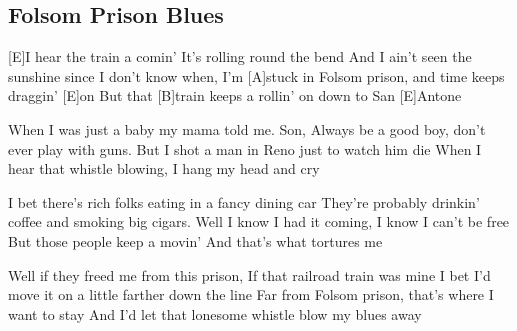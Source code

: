 \subsection*{Folsom Prison Blues   }



\begin{guitar}

[E]I hear the train a comin'
It's rolling round the bend
And I ain't seen the sunshine since I don't know when,
I'm [A]stuck in Folsom prison, and time keeps draggin' [E]on
But that [B]train keeps a rollin' on down to San [E]Antone


When I was just a baby my mama told me. Son,
Always be a good boy, don't ever play with guns.
But I shot a man in Reno just to watch him die
When I hear that whistle blowing, I hang my head and cry

I bet there's rich folks eating in a fancy dining car
They're probably drinkin' coffee and smoking big cigars.
Well I know I had it coming, I know I can't be free
But those people keep a movin'
And that's what tortures me

Well if they freed me from this prison,
If that railroad train was mine
I bet I'd move it on a little farther down the line
Far from Folsom prison, that's where I want to stay
And I'd let that lonesome whistle blow my blues away
\end{guitar}
